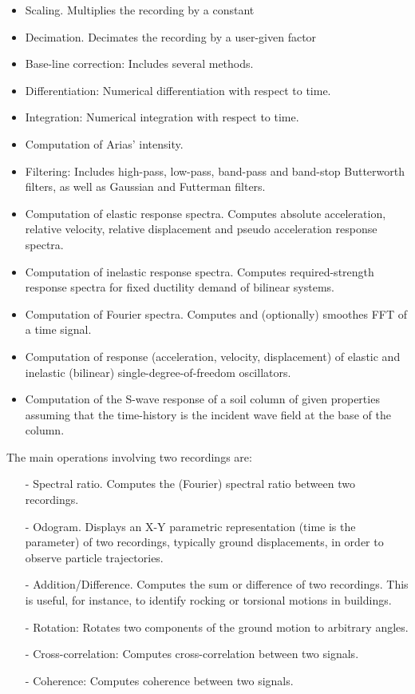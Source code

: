 \begin{itemize}
\item
Scaling. Multiplies the recording by a constant 
\item
Decimation. Decimates the recording by a user-given factor 
\item
Base-line correction: Includes several methods. 
\item
Differentiation: Numerical differentiation with respect to time. 
\item
Integration: Numerical integration with respect to time. 
\item
Computation of Arias' intensity. 
\item
Filtering: Includes high-pass, low-pass, band-pass and band-stop Butterworth filters, as well as Gaussian and Futterman filters. 
\item
Computation of elastic response spectra. Computes absolute acceleration, relative velocity, relative displacement and pseudo acceleration response spectra. 
\item
Computation of inelastic response spectra. Computes required-strength response spectra for fixed ductility demand of bilinear systems. 
\item
Computation of Fourier spectra. Computes and (optionally) smoothes FFT of a time signal. 
\item
Computation of response (acceleration, velocity, displacement) of elastic and inelastic (bilinear) single-degree-of-freedom oscillators. 
\item
Computation of the S-wave response of a soil column of given properties assuming that the time-history is the incident wave field at the base of the column. 
\end{itemize}


The main operations involving two recordings are: 
\begin{itemize}
\item[-]
 Spectral ratio. Computes the (Fourier) spectral ratio between two recordings. 
\item[-]
Odogram. Displays an X-Y parametric representation (time is the parameter) of two recordings, typically ground displacements, in order to observe particle trajectories. 
\item[-]
Addition/Difference. Computes the sum or difference of two recordings. This is useful, for instance, to identify rocking or torsional motions in buildings. 
\item[-]
Rotation: Rotates two components of the ground motion to arbitrary angles. 
\item[-]
Cross-correlation: Computes cross-correlation between two signals. 
\item[-]
Coherence: Computes coherence between two signals. 
\end{itemize}

